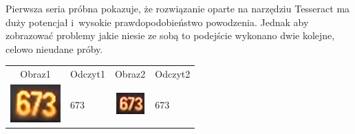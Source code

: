 Pierwsza seria próbna pokazuje, że rozwiązanie oparte na narzędziu
Tesseract ma duży potencjał i~wysokie prawdopodobieństwo powodzenia.
Jednak aby zobrazować problemy jakie niesie ze sobą to podejście
wykonano dwie kolejne, celowo nieudane próby.

\begin{table}[h!]
  \centering
  \begin{tabular}{c l c l}
    Obraz1 & Odczyt1 & Obraz2 & Odczyt2  \\ 
    \begin{minipage}{.2\textwidth}
      \includegraphics[width=\textwidth]{img/exp_number_n01}
    \end{minipage}
    &
    673
    &
    \begin{minipage}{.2\textwidth}
      \includegraphics[width=\textwidth]{img/exp_number_n02}
    \end{minipage}
    &
    673
     

\end{tabular}
\end{table}
